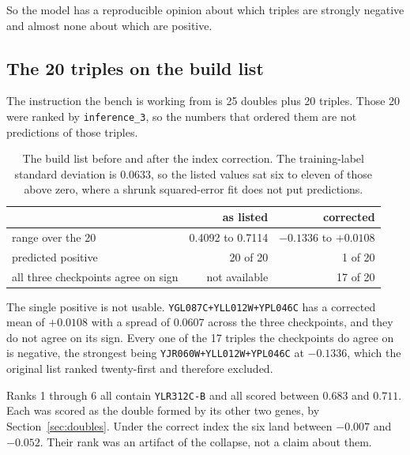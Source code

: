 So the model has a reproducible opinion about which triples are strongly negative
and almost none about which are positive.

\subsection{The 20 triples on the build list}
\label{sec:buildlist}

The instruction the bench is working from is 25 doubles plus 20 triples. Those 20
were ranked by \texttt{inference\_3}, so the numbers that ordered them are not
predictions of those triples.

\begin{table}[htbp]
\centering
\begin{tabular}{lrr}
\hline
& as listed & corrected \\
\hline
range over the 20 & 0.4092 to 0.7114 & $-0.1336$ to $+0.0108$ \\
predicted positive & 20 of 20 & 1 of 20 \\
all three checkpoints agree on sign & not available & 17 of 20 \\
\hline
\end{tabular}
\caption{The build list before and after the index correction. The training-label
standard deviation is $0.0633$, so the listed values sat six to eleven of those
above zero, where a shrunk squared-error fit does not put predictions.}
\label{tab:buildlist}
\end{table}


The single positive is not usable. \texttt{YGL087C+YLL012W+YPL046C} has a
corrected mean of $+0.0108$ with a spread of $0.0607$ across the three
checkpoints, and they do not agree on its sign. Every one of the 17 triples the
checkpoints do agree on is negative, the strongest being
\texttt{YJR060W+YLL012W+YPL046C} at $-0.1336$, which the original list ranked
twenty-first and therefore excluded.

Ranks 1 through 6 all contain \texttt{YLR312C-B} and all scored between $0.683$
and $0.711$. Each was scored as the double formed by its other two genes, by
Section~\ref{sec:doubles}. Under the correct index the six land between $-0.007$
and $-0.052$. Their rank was an artifact of the collapse, not a claim about them.

